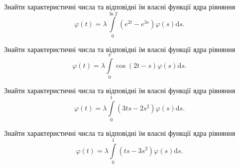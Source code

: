 \documentclass[12pt]{extarticle}
\begin{document}
\begin{Exercise}
Знайти характеристичні числа та відповідні їм власні функції ядра рівняння \[\varphi(t) = \lambda\int\limits_{0}^{\ln 2} (e^{2t} - e^{3s}) \varphi(s) \mathrm{d}s.\]
\end{Exercise}

\begin{Exercise}
Знайти характеристичні числа та відповідні їм власні функції ядра рівняння \[\varphi(t) = \lambda\int\limits_{0}^{\pi}  \cos (2t-s) \varphi(s) \mathrm{d}s.\]
\end{Exercise}

\begin{Exercise}
Знайти характеристичні числа та відповідні їм власні функції ядра рівняння \[\varphi(t) = \lambda\int\limits_{0}^{1} (3t s - 2s^2) \varphi(s) \mathrm{d}s.\]
\end{Exercise}

\begin{Exercise}
Знайти характеристичні числа та відповідні їм власні функції ядра рівняння \[\varphi(t) = \lambda\int\limits_{0}^{1} (t s - 3s^2) \varphi(s) \mathrm{d}s.\]
\end{Exercise}
\end{document}
